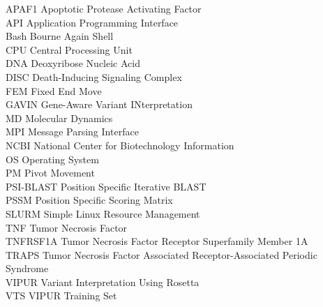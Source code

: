APAF1 Apoptotic Protease Activating Factor\\
API Application Programming Interface\\
Bash Bourne Again Shell\\
CPU Central Processing Unit\\
DNA Deoxyribose Nucleic Acid\\
DISC Death-Inducing Signaling Complex\\
FEM Fixed End Move\\
GAVIN Gene-Aware Variant INterpretation\\
MD	Molecular Dynamics\\
MPI Message Parsing Interface\\
NCBI National Center for Biotechnology Information\\
OS Operating System\\
PM Pivot Movement\\
PSI-BLAST Position Specific Iterative BLAST\\
PSSM Position Specific Scoring Matrix\\
SLURM Simple Linux Resource Management\\
TNF Tumor Necrosis Factor\\
TNFRSF1A Tumor Necrosis Factor Receptor Superfamily Member 1A\\
TRAPS Tumor Necrosis Factor Associated Receptor-Associated Periodic Syndrome\\
VIPUR Variant Interpretation Using Rosetta\\
VTS VIPUR Training Set\\